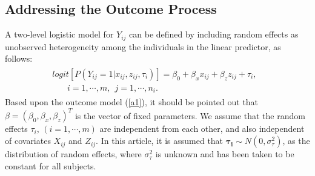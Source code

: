 \documentclass[twoside]{article}
\begin{document}
  \subsection{Addressing the Outcome Process}
A two-level logistic model for $Y_{ij}$ can be defined by including random effects as unobserved heterogeneity among the individuals in the linear predictor, as follows:
\begin{eqnarray}\label{a1}
\begin{array}{l}
 logit [P(Y_{ij}=1|x_{ij},z_{ij},\tau_{i})]=\beta _{0}+\beta_{x}x_{ij}+\beta_{z}z_{ij}+\tau_i, \ \ \ \\ \ \ \ \ \ \ \ \ i=1,\cdots,m,\ \ j=1,\cdots,n_i.
 \end{array}
  \end{eqnarray}
Based upon the outcome model (\ref{a1}), it should be pointed out that $\beta=(\beta_{0}, \beta _{x},\beta_{z})^T$ is the vector of fixed parameters. We assume that the random effects $\tau _i$, $ (i=1,\cdots,m)$ are independent from each other, and also independent of covariates $X_{ij}$ and $Z_{ij}$. In this article, it is assumed that $\boldsymbol{\tau _i} \sim N(0,\sigma_{\tau} ^2)$, as the distribution of random effects, where $\sigma_{\tau} ^2$ is unknown and has been taken to be constant for all subjects.
\end{document}
